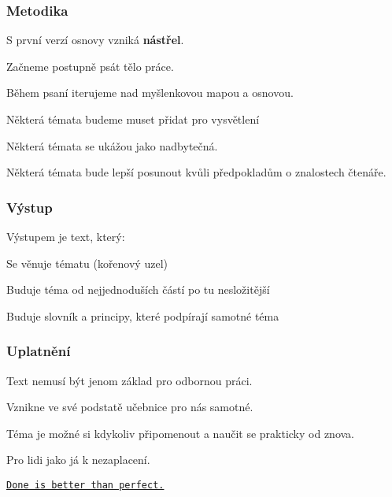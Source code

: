 \documentclass[FM]{tulpresentation}
\begin{document}
	\begin{frame}
		\frametitle{Metodika}
		\begin{items}
			\item S první verzí osnovy vzniká \textbf{nástřel}.
			\item Začneme postupně psát tělo práce.
			\item Během psaní iterujeme nad myšlenkovou mapou a osnovou.
			\begin{subitems}
				\item Některá témata budeme muset přidat pro vysvětlení
				\item Některá témata se ukážou jako nadbytečná.
				\item Některá témata bude lepší posunout kvůli předpokladům o znalostech čtenáře.
			\end{subitems}
		\end{items}
	\end{frame}
	
	\begin{frame}
		\frametitle{Výstup}
		\begin{items}
			\item Výstupem je text, který:
			\begin{subitems}
				\item Se věnuje tématu (kořenový uzel)
				\item Buduje téma od nejjednoduších částí po tu nesložitější
				\item Buduje slovník a principy, které podpírají samotné téma
			\end{subitems}
		\end{items}
	\end{frame}
	
	\begin{frame}
		\frametitle{Uplatnění}
		\begin{items}
			\item Text nemusí být jenom základ pro odbornou práci.
			\item Vznikne ve své podstatě učebnice pro nás samotné.
			\begin{subitems}
				\item Téma je možné si kdykoliv připomenout a naučit se prakticky od znova.
				\item Pro lidi jako já k nezaplacení.
			\end{subitems}
			\item \href{https://xkcd.com/1205/}{\texttt{Done is better than perfect.}}
		\end{items}
	\end{frame}
	
\end{document}
